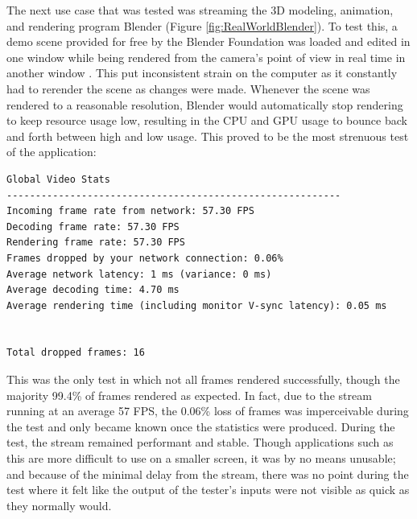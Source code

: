 The next use case that was tested was streaming the 3D modeling, animation, and rendering program Blender (Figure \ref{fig:RealWorldBlender}).
To test this, a demo scene provided for free by the Blender Foundation was loaded and edited in one window while being rendered from the camera's point of view in real time in another window \cite{BlenderDemoScene}.
This put inconsistent strain on the computer as it constantly had to rerender the scene as changes were made.
Whenever the scene was rendered to a reasonable resolution, Blender would automatically stop rendering to keep resource usage low, resulting in the CPU and GPU usage to bounce back and forth between high and low usage.
This proved to be the most strenuous test of the application:

\begin{lstlisting}[style=plaintext,title=Statistics recorded while streaming Blender (Figure \ref{fig:RealWorldBlender})]
  Global Video Stats
----------------------------------------------------------
Incoming frame rate from network: 57.30 FPS
Decoding frame rate: 57.30 FPS
Rendering frame rate: 57.30 FPS
Frames dropped by your network connection: 0.06%
Average network latency: 1 ms (variance: 0 ms)
Average decoding time: 4.70 ms
Average rendering time (including monitor V-sync latency): 0.05 ms


Total dropped frames: 16
\end{lstlisting}

This was the only test in which not all frames rendered successfully, though the majority 99.4\% of frames rendered as expected.
In fact, due to the stream running at an average 57 FPS, the 0.06\% loss of frames was imperceivable during the test and only became known once the statistics were produced.
During the test, the stream remained performant and stable.
Though applications such as this are more difficult to use on a smaller screen, it was by no means unusable; and because of the minimal delay from the stream, there was no point during the test where it felt like the output of the tester's inputs were not visible as quick as they normally would.

